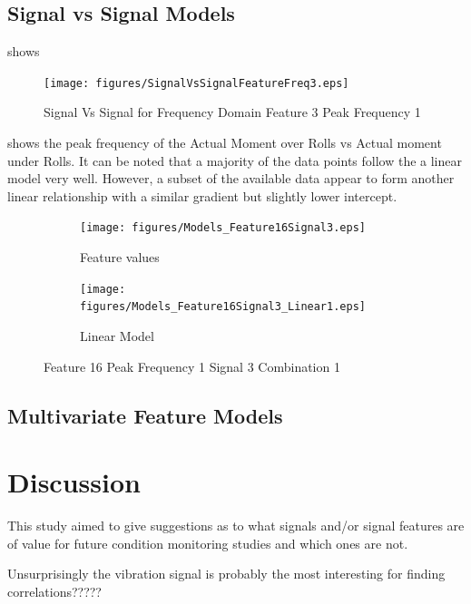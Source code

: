 \documentclass[]{article}
\begin{document}
\subsection{Signal vs Signal Models}
 shows 
\begin{figure}[H]
    \centering
    \texttt{[image: figures/SignalVsSignalFeatureFreq3.eps]}
    \caption{Signal Vs Signal for Frequency Domain Feature 3 Peak Frequency 1}
    \label{fig:SignalVsSignalFeatureFreq3}
\end{figure}
 shows the peak frequency of the Actual Moment over Rolls vs Actual moment under Rolls. It can be noted that a majority of the data points follow the a linear model very well. However, a subset of the available data appear to form another linear relationship with a similar gradient but slightly lower intercept.
\begin{figure}[H]
	\centering
	\begin{subfigure}{.5\textwidth}
		\centering
    		\texttt{[image: figures/Models\_Feature16Signal3.eps]}
	 	\caption{Feature values}
	  	\label{fig:Models_Feature16Signal3}
	\end{subfigure}%
	\begin{subfigure}{.5\textwidth}
	  \centering
 	   	\texttt{[image: figures/Models\_Feature16Signal3\_Linear1.eps]}
	  	\caption{Linear Model}
	  	\label{fig:Models_Feature16Signal3_Linear1}
	\end{subfigure}
   	\caption{Feature 16 Peak Frequency 1 Signal 3 Combination 1}
    \label{fig:Models_Feature16Signal3_Caption}
\end{figure}

\subsection{Multivariate Feature Models}

\clearpage 

\section{Discussion}
This study aimed to give suggestions as to what signals and/or signal features are of value for future condition monitoring studies and which ones are not. 

Unsurprisingly the vibration signal is probably the most interesting for finding correlations?????
\end{document}
